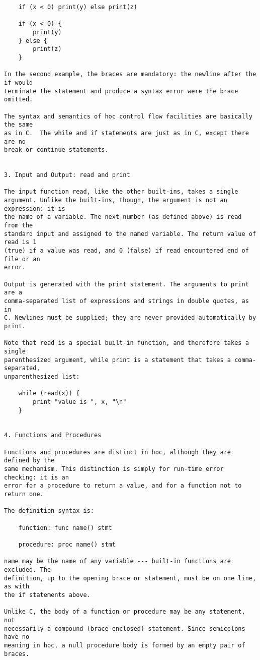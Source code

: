 \begin{verbatim}
    if (x < 0) print(y) else print(z)

    if (x < 0) {
        print(y)
    } else {
        print(z)
    }
    
In the second example, the braces are mandatory: the newline after the if would
terminate the statement and produce a syntax error were the brace omitted.

The syntax and semantics of hoc control flow facilities are basically the same
as in C.  The while and if statements are just as in C, except there are no
break or continue statements.


3. Input and Output: read and print

The input function read, like the other built-ins, takes a single
argument. Unlike the built-ins, though, the argument is not an expression: it is
the name of a variable. The next number (as defined above) is read from the
standard input and assigned to the named variable. The return value of read is 1
(true) if a value was read, and 0 (false) if read encountered end of file or an
error.

Output is generated with the print statement. The arguments to print are a
comma-separated list of expressions and strings in double quotes, as in
C. Newlines must be supplied; they are never provided automatically by print.

Note that read is a special built-in function, and therefore takes a single
parenthesized argument, while print is a statement that takes a comma-separated,
unparenthesized list:

    while (read(x)) {
        print "value is ", x, "\n"
    }


4. Functions and Procedures

Functions and procedures are distinct in hoc, although they are defined by the
same mechanism. This distinction is simply for run-time error checking: it is an
error for a procedure to return a value, and for a function not to return one.

The definition syntax is:

    function: func name() stmt

    procedure: proc name() stmt
    
name may be the name of any variable --- built-in functions are excluded. The
definition, up to the opening brace or statement, must be on one line, as with
the if statements above.

Unlike C, the body of a function or procedure may be any statement, not
necessarily a compound (brace-enclosed) statement. Since semicolons have no
meaning in hoc, a null procedure body is formed by an empty pair of braces.


\end{verbatim}
